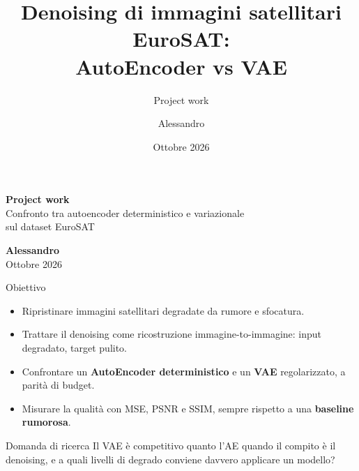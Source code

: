 \documentclass[aspectratio=169,t]{beamer}
\title[Denoising EuroSAT: AE vs VAE]{Denoising di immagini satellitari EuroSAT:\\AutoEncoder vs VAE}
\subtitle{Project work}
\author{Alessandro}
\date{Ottobre 2026}
\newenvironment{points}{%
  \begin{itemize}\setlength{\itemsep}{0.35em}\setlength{\parskip}{0pt}%
}{\end{itemize}}
\begin{document}
\begin{frame}[plain]
  \vspace*{-1cm}%
  \noindent{}%

  \vspace{0.95cm}
  {\large\color{primary}\bfseries Project work}\\[0.35em]
  {\color{muted}Confronto tra autoencoder deterministico e variazionale\\sul dataset EuroSAT}

  \vfill
  {\large\color{ink}\bfseries Alessandro}\\[0.25em]
  {\color{muted}Ottobre 2026}
\end{frame}

\begin{frame}{Obiettivo}
  \begin{points}
    \item Ripristinare immagini satellitari degradate da rumore e sfocatura.
    \item Trattare il denoising come ricostruzione immagine-to-immagine:
          input degradato, target pulito.
    \item Confrontare un \textbf{AutoEncoder deterministico} e un
          \textbf{VAE} regolarizzato, a parità di budget.
    \item Misurare la qualità con MSE, PSNR e SSIM, sempre rispetto a una
          \textbf{baseline rumorosa}.
  \end{points}

  \vspace{0.35cm}
  \begin{block}{Domanda di ricerca}
    Il VAE è competitivo quanto l'AE quando il compito è il denoising, e a
    quali livelli di degrado conviene davvero applicare un modello?
  \end{block}
\end{frame}
\end{document}
